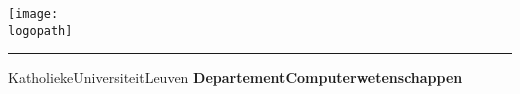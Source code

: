 \documentclass[a4paper, 12pt]{article}
\begin{document}

\begin{titlepage}
    \newpage
    \thispagestyle{empty}
    \frenchspacing
    \hspace{-0.2cm}
    \texttt{[image: \\logopath]}
    \hspace{0.2cm}
    \rule{0.5pt}{3.4cm}
    \hspace{0.2cm}
    \begin{minipage}[b]{8cm}
        \Large{Katholieke\newline Universiteit\newline Leuven}\smallskip
        \newline
        \large{}\smallskip\newline
        \textbf{Departement\newline Computerwetenschappen}\smallskip
    \end{minipage}
    \vspace*{3.2cm}\vfill
    \begin{center}
        \begin{minipage}[t]{\textwidth}
            \begin{center}
                \LARGE{\rm{\textbf{\uppercase{\titletext}}}}\\
                \Large{\rm{\subtitletext}}
            \end{center}
        \end{minipage}
    \end{center}
    \vfill
    \hfill{}
\end{titlepage}
\end{document}
